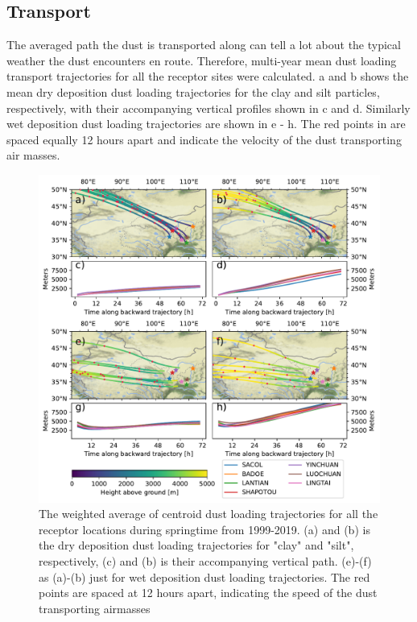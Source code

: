 \subsection{Transport}
The averaged path the dust is transported along can tell a lot about the typical weather the dust encounters en route.    
Therefore, multi-year mean dust loading transport trajectories for all the receptor sites were calculated.
a and b shows the mean dry deposition dust loading trajectories for the clay and silt particles, respectively, with their accompanying vertical profiles shown in c and d. Similarly wet deposition dust loading trajectories are shown in e - h. 
The red points in  are spaced equally 12 hours apart and  indicate the velocity of the dust transporting air masses. 
\begin{figure}[hptb]
    \centering
    \includegraphics[width=\textwidth]{texfiles/figs/average_dust_transport_trajectories.pdf}
    \caption{The weighted average of centroid dust loading trajectories for all the receptor locations during springtime from 1999-2019. (a) and (b) is the dry deposition dust loading trajectories for "clay" and "silt", respectively, (c) and (b) is their accompanying vertical path.  (e)-(f) as (a)-(b) just for wet deposition dust loading trajectories. The red points are spaced at 12 hours apart, indicating the speed of the dust transporting airmasses }
    \label{fig:dust_loading_trajecs}
\end{figure}

